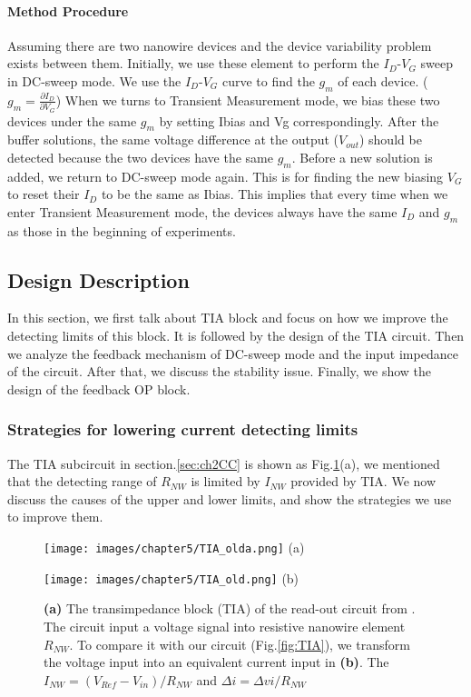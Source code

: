 \paragraph*{Method Procedure}
Assuming there are two nanowire devices and the device variability problem exists between them.
Initially, we use these element to perform the $I_D$-$V_G$ sweep in DC-sweep mode.
We use the $I_D$-$V_G$ curve to find the $g_m$ of each device. ($g_m = \frac{\partial I_D}{\partial V_G}$)
When we turns to Transient Measurement mode, we bias these two devices under the same $g_m$ by setting Ibias and Vg correspondingly.
After the buffer solutions, the same voltage difference at the output ($V_{out}$) should be detected because the two devices have the same $g_m$.
Before a new solution is added, we return to DC-sweep mode again.
This is for finding the new biasing $V_G$ to reset their $I_D$ to be the same as Ibias.
This implies that every time when we enter Transient Measurement mode, the devices always have the same $I_D$ and $g_m$ as those in the beginning of experiments.


\subsection{Design Description}
In this section, we first talk about TIA block and focus on how we improve the detecting limits of this block.
It is followed by the design of the TIA circuit.
Then we analyze the feedback mechanism of DC-sweep mode and the input impedance of the circuit.
After that, we discuss the stability issue.
Finally, we show the design of the feedback OP block.

\subsubsection{Strategies for lowering current detecting limits} \label{sec:Ibias}
The TIA subcircuit in section.\ref{sec:ch2CC} is shown as Fig.\ref{fig:TIA_old}(a), we mentioned that the detecting range of $R_{NW}$ is limited by $I_{NW}$ provided by TIA.
We now discuss the causes of the upper and lower limits, and show the strategies we use to improve them.

\begin{figure}[!htb]
    \centering
    \begin{minipage}[t]{0.45\textwidth}
        \texttt{[image: images/chapter5/TIA\_olda.png]}
        (a)
    \end{minipage}
    \hfill
    \begin{minipage}[t]{0.45\textwidth}
        \texttt{[image: images/chapter5/TIA\_old.png]}
        (b)
    \end{minipage}
    \caption{\textbf{(a)} The transimpedance block (TIA) of the read-out circuit from \cite{Jlockin}. The circuit input a voltage signal into resistive nanowire element $R_{NW}$.
            To compare it with our circuit (Fig.\ref{fig:TIA}), we transform the voltage input into an equivalent current input in \textbf{(b)}. The $I_{NW} = (V_{Ref} - V_{in})/R_{NW}$ and $\Delta i = \Delta vi /R_{NW}$}
    \label{fig:TIA_old}
\end{figure}

